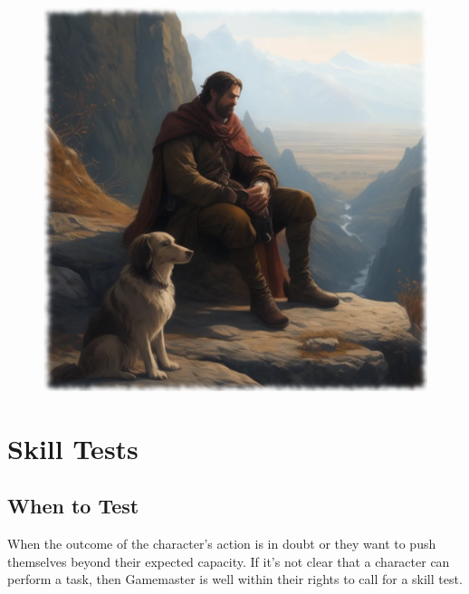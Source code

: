 
\begin{figure}
\begin{center}
\includegraphics[scale=0.24]{img/ai-images/man-with-dog.png}
\end{center}
\end{figure}


\section{Skill Tests}

\subsection{When to Test}
When the outcome of the character’s action is in doubt or they want to push themselves beyond their expected capacity. If it’s not clear that a character can perform a task, then Gamemaster is well within their rights to call for a skill test.

